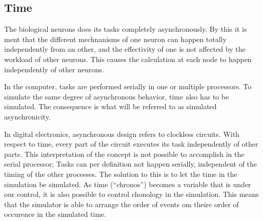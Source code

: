 

	\subsection{Time}
	\label{ssecTime}
	The biological neurons does its tasks completely asynchronously.
	By this it is ment that the different mechnanisms of one neuron can happen totally independently from an other, and the effectivity of one is not affected by the workload of other neurons.
	This causes the calculation at each node to happen independently of other neurons.


	In the computer, tasks are performed serially in one or multiple processors.
	To simulate the same degree of asynchronous behavior, time also has to be simulated. %
	The consequence is what will be referred to as simulated asynchronicity.

	In digital electronics, asynchronous design refers to clockless circuits. 
	With respect to time, every part of the circuit executes its task independently of other parts.
	This interpretation of the concept is not possible to accomplish in the serial processor; Tasks can per definition not happen serially, independent of the timing of the other processes.
	The solution to this is to let the time in the simulation be simulated.
	As time (``chronos'') becomes a variable that is under our control, it is also possible to control chonology in the simulation. %
	This means that the simulator is able to arrange the order of events om theire order of occurence in the simulated time. %
	
